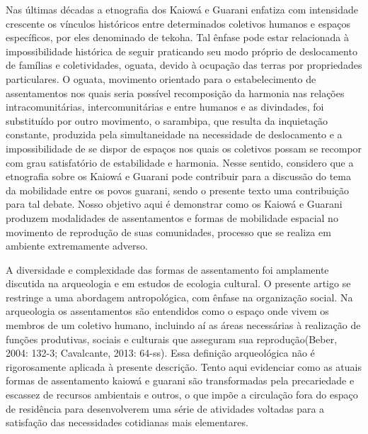 {{Nas últimas décadas a etnografia dos Kaiowá e Guarani enfatiza com
intensidade crescente os vínculos históricos entre determinados
coletivos humanos e espaços específicos, por eles denominado de tekoha.
Tal ênfase pode estar relacionada à impossibilidade histórica de seguir
praticando seu modo próprio de deslocamento de famílias e
coletividades, oguata, devido à ocupação das terras por propriedades
particulares. O oguata, movimento orientado para o estabelecimento de
assentamentos nos quais seria possível recomposição da harmonia nas
relações intracomunitárias, intercomunitárias e entre humanos e as
divindades, foi substituído por outro movimento, o sarambipa, que
resulta da inquietação constante, produzida pela simultaneidade na
necessidade de deslocamento e a impossibilidade de se dispor de espaços
nos quais os coletivos possam se recompor com grau satisfatório de
estabilidade e harmonia. Nesse sentido, considero que a etnografia
sobre os Kaiowá e Guarani pode contribuir para a discussão do tema da
mobilidade entre os povos guarani, sendo o presente texto uma
contribuição para tal debate. Nosso objetivo aqui é demonstrar como os
Kaiowá e Guarani produzem modalidades de assentamentos e formas de
mobilidade espacial no movimento de reprodução de suas comunidades,
processo que se realiza em ambiente extremamente adverso.

A diversidade e complexidade das formas de assentamento foi amplamente
discutida na arqueologia e em estudos de ecologia cultural. O presente
artigo se restringe a uma abordagem antropológica, com ênfase na
organização social. Na arqueologia os assentamentos são entendidos como
o espaço onde vivem os membros de um coletivo humano, incluindo aí as
áreas necessárias à realização de funções produtivas, sociais e
culturais que asseguram sua reprodução(Beber, 2004: 132-3; 
Cavalcante, 2013: 64-ss). Essa definição
arqueológica não é rigorosamente aplicada à presente descrição. Tento
aqui evidenciar como as atuais formas de assentamento kaiowá e guarani
são transformadas pela precariedade e escassez de recursos ambientais e
outros, o que impõe a circulação fora do espaço de residência para
desenvolverem uma série de atividades voltadas para a satisfação das
necessidades cotidianas mais elementares. 

}}
